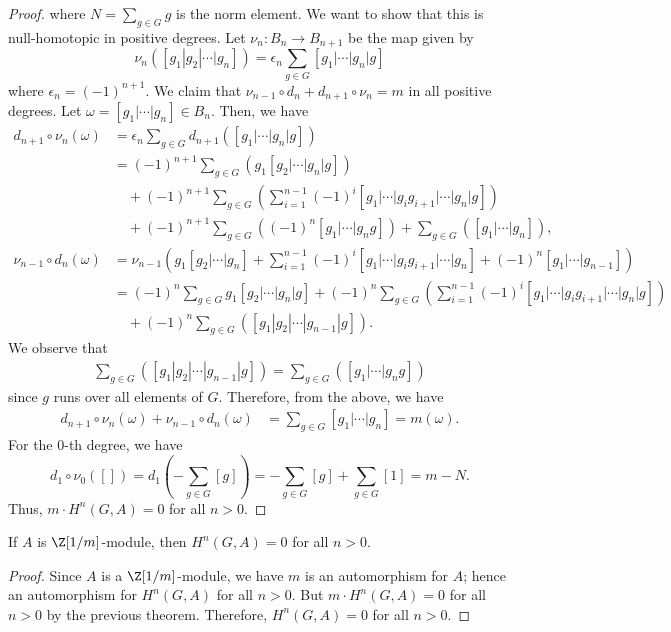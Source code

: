 \begin{proof}
    \noindent
    where $N = \sum_{g\in G} g$ is the norm element.
    We want to show that this is null-homotopic in positive degrees.
    Let $\nu_n: B_n \to B_{n+1}$ be the map given by
    \[
        \nu_n([g_1|g_2|\cdots|g_n]) = \epsilon_n \sum_{g\in G} [g_1|\cdots|g_n|g]
    \]
    where $\epsilon_n = (-1)^{n+1}$.
    We claim that $\nu_{n-1}\circ d_n + d_{n+1}\circ \nu_n = m$ in all positive degrees.
    Let $\omega = [g_1|\cdots|g_n] \in B_n$.
    Then, we have
    \begin{align*}
        d_{n+1}\circ \nu_n(\omega) &= \epsilon_n \sum_{g\in G} d_{n+1}([g_1|\cdots|g_n|g])\\
        &= (-1)^{n+1} \sum_{g\in G} \left( g_1 [g_2|\cdots|g_n|g]\right)\\
        &\quad + (-1)^{n+1} \sum_{g\in G}\left(\sum_{i=1}^{n-1} (-1)^i [g_1|\cdots|g_ig_{i+1}|\cdots|g_n|g]\right)\\
        &\quad + (-1)^{n+1} \sum_{g\in G}\left((-1)^n [g_1|\cdots|g_ng]\right) +\sum_{g\in G}\left([g_1|\cdots|g_n]\right),
        \\
        \nu_{n-1}\circ d_n(\omega) &= \nu_{n-1}\left(g_1[g_2|\cdots|g_n] + \sum_{i=1}^{n-1} (-1)^i [g_1|\cdots|g_ig_{i+1}|\cdots|g_n] + (-1)^n [g_1|\cdots|g_{n-1}]\right)\\
        &= (-1)^n \sum_{g\in G} g_1[g_2|\cdots|g_n|g] + (-1)^n \sum_{g\in G}\left(\sum_{i=1}^{n-1} (-1)^i [g_1|\cdots|g_ig_{i+1}|\cdots|g_n|g]\right)\\
        &\quad + (-1)^n \sum_{g\in G}\left([g_1|g_2|\cdots|g_{n-1}|g]\right).
    \end{align*}
    We observe that
    \begin{align*}
        \sum_{g\in G}\left([g_1|g_2|\cdots|g_{n-1}|g]\right) = \sum_{g\in G}\left([g_1|\cdots|g_ng]\right)
    \end{align*}
    since $g$ runs over all elements of $G$.
    Therefore, from the above, we have
    \begin{align*}
        d_{n+1}\circ \nu_n(\omega) + \nu_{n-1}\circ d_n(\omega) &= \sum_{g\in G} [g_1|\cdots|g_n] = m(\omega).
    \end{align*}
    For the $0$-th degree, we have
    \[
        d_1\circ \nu_0([]) = d_1\left(-\sum_{g\in G} [g]\right) = -\sum_{g\in G} [g] + \sum_{g\in G} [1] = m-N.
    \]
    Thus, $m \cdot H^n(G,A) = 0$ for all $n>0$.
\end{proof}

\begin{corollary}
    If $A$ is $\Z[1/m]$-module, then $H^n(G,A) = 0$ for all $n>0$.
\end{corollary}
\begin{proof}
    Since $A$ is a $\Z[1/m]$-module, we have $m$ is an automorphism for $A$; hence an automorphism for $H^n(G,A)$ for all $n>0$.
    But $m \cdot H^n(G,A) = 0$ for all $n>0$ by the previous theorem.
    Therefore, $H^n(G,A) = 0$ for all $n>0$.
\end{proof}


